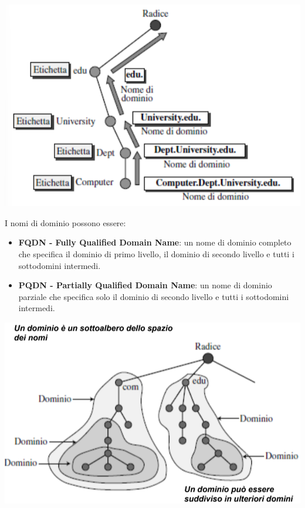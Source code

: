 \documentclass[12pt]{report}
\begin{document}
	\begin{center}
		\includegraphics[scale=0.5]{assets/dns-label.png}
	\end{center}
	I nomi di dominio possono essere:
	\begin{itemize}
		\item \textbf{FQDN - Fully Qualified Domain Name}: un nome di dominio completo che specifica il dominio di primo livello, il dominio di secondo livello e tutti i sottodomini intermedi.
		\item \textbf{PQDN - Partially Qualified Domain Name}: un nome di dominio parziale che specifica solo il dominio di secondo livello e tutti i sottodomini intermedi.
	\end{itemize}
	\begin{center}
		\includegraphics[scale=0.5]{assets/dns-fqdn.png}
	\end{center}
\end{document}

